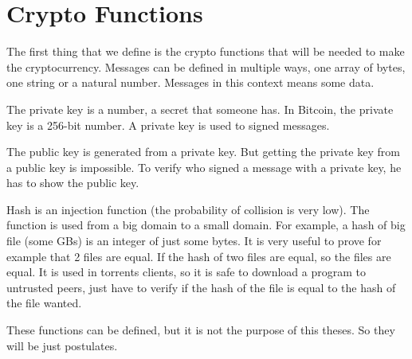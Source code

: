 \section{Crypto Functions}
The first thing that we define is the crypto functions that will be needed to make the cryptocurrency.
Messages can be defined in multiple ways, one array of bytes, one string or a natural number.
Messages in this context means some data.

The private key is a number, a secret that someone has.
In Bitcoin, the private key is a 256-bit number.
A private key is used to signed messages.

The public key is generated from a private key.
But getting the private key from a public key is impossible.
To verify who signed a message with a private key, he has to show the public key.

Hash is an injection function (the probability of collision is very low).
The function is used from a big domain to a small domain.
For example, a hash of big file (some GBs) is an integer of just some bytes.
It is very useful to prove for example that 2 files are equal.
If the hash of two files are equal, so the files are equal.
It is used in torrents clients, so it is safe to download a program to untrusted peers,
just have to verify if the hash of the file is equal to the hash of the file wanted.

These functions can be defined, but it is not the purpose of this theses.
So they will be just postulates.

